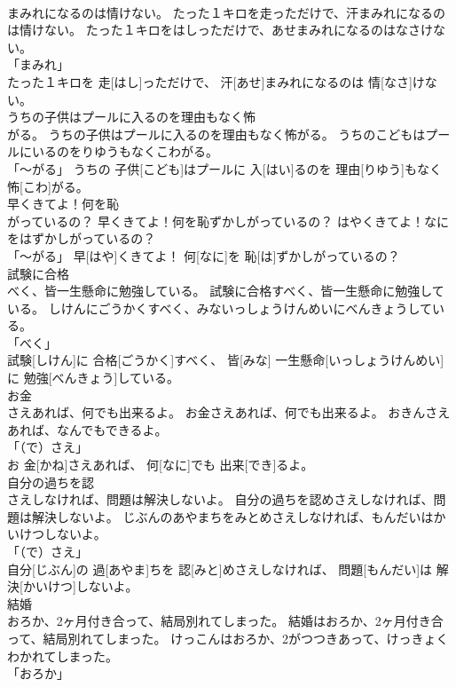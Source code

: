 \documentclass[8pt]{extreport}
\begin{document}
\begin{CJK}{UTF8}{min}
\\	まみれになるのは情けない。	たった１キロを走っただけで、汗まみれになるのは情けない。	たった１キロをはしっただけで、あせまみれになるのはなさけない。	
\\	「まみれ」 
\\	たった１キロを 走[はし]っただけで、 汗[あせ]まみれになるのは 情[なさ]けない。		
\\	うちの子供はプールに入るのを理由もなく怖
\\	がる。	うちの子供はプールに入るのを理由もなく怖がる。	うちのこどもはプールにいるのをりゆうもなくこわがる。	
\\	「～がる」	うちの 子供[こども]はプールに 入[はい]るのを 理由[りゆう]もなく 怖[こわ]がる。		
\\	早くきてよ！何を恥
\\	がっているの？	早くきてよ！何を恥ずかしがっているの？	はやくきてよ！なにをはずかしがっているの？	
\\	「～がる」	早[はや]くきてよ！ 何[なに]を 恥[は]ずかしがっているの？		
\\	試験に合格
\\	べく、皆一生懸命に勉強している。	試験に合格すべく、皆一生懸命に勉強している。	しけんにごうかくすべく、みないっしょうけんめいにべんきょうしている。	
\\	「べく」 
\\	試験[しけん]に 合格[ごうかく]すべく、 皆[みな] 一生懸命[いっしょうけんめい]に 勉強[べんきょう]している。		
\\	お金
\\	さえあれば、何でも出来るよ。	お金さえあれば、何でも出来るよ。	おきんさえあれば、なんでもできるよ。	
\\	「（で）さえ」 
\\	お 金[かね]さえあれば、 何[なに]でも 出来[でき]るよ。		
\\	自分の過ちを認
\\	さえしなければ、問題は解決しないよ。	自分の過ちを認めさえしなければ、問題は解決しないよ。	じぶんのあやまちをみとめさえしなければ、もんだいはかいけつしないよ。	
\\	「（で）さえ」 
\\	自分[じぶん]の 過[あやま]ちを 認[みと]めさえしなければ、 問題[もんだい]は 解決[かいけつ]しないよ。		
\\	結婚
\\	おろか、2ヶ月付き合って、結局別れてしまった。	結婚はおろか、2ヶ月付き合って、結局別れてしまった。	けっこんはおろか、2がつつきあって、けっきょくわかれてしまった。	
\\	「おろか」 

\end{CJK}
\end{document}
